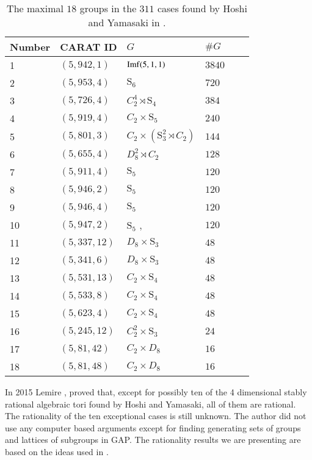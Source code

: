\documentclass[a4paper, 14pt]{extarticle}
\theoremstyle{plain}
\theoremstyle{definition}
\begin{document}
\begin{table}[H]\label{tbl:18Max}
\centering
\begin{tabular}{llllll} 
Number & CARAT ID & $G$ & $\#G$\\ \hline
 1  & $(5,942,1)$ & ${\rm Imf}(5,1,1)$ & $3840$\\
2  & $(5,953,4)$ & $\mathrm{S}_6$ & $720$ \\
3  & $(5,726,4)$ & $C_2^4\rtimes \mathrm{S}_4$ & $384$  \\
4  & $(5,919,4)$ & $C_2\times \mathrm{S}_5$ & $240$ \\
5 & $(5,801,3)$ & $C_2\times (\mathrm{S}_3^2\rtimes C_2)$ & $144$ \\
6 & $(5,655,4)$ & $D_8^2\rtimes C_2$ & $128$ \\
7  & $(5,911,4)$ & $\mathrm{S}_5$ & $120$ \\
8 & $(5,946,2)$ & $\mathrm{S}_5$ & $120$ \\
9 & $(5,946,4)$ & $\mathrm{S}_5$ & $120$ \\
10 & $(5,947,2)$ & $\mathrm{S}_5$ ,\,\,\,\,\,\,\,\,\,\,\,\,\,\,\,\,\,\,\,\,\,\,\,\,\,\,\,\,\,\ & $120$ \\
11 & $(5,337,12)$ & $D_8\times \mathrm{S}_3$ & $48$ \\
12  & $(5,341,6)$ & $D_8\times \mathrm{S}_3$ & $48$ \\
13  & $(5,531,13)$ & $C_2\times \mathrm{S}_4$ & $48$ \\
14  & $(5,533,8)$ & $C_2\times \mathrm{S}_4$ & $48$ \\
15 & $(5,623,4)$ & $C_2\times \mathrm{S}_4$ & $48$\\
16   & $(5,245,12)$ & $C_2^2\times \mathrm{S}_3$ & $24$\\
17  & $(5,81,42)$ & $C_2\times D_8$ & $16$ \\
18  & $(5,81,48)$ & $C_2\times D_8$ & $16$ \\
\end{tabular}
\caption{The maximal $18$ groups 
in the  $311$ cases found by Hoshi and Yamasaki in \cite{Hoshi}.}
\end{table}
\noindent
In 2015 Lemire \cite{Nicole1}, proved that, except for possibly ten of the 
4 dimensional stably rational algebraic tori found by Hoshi and Yamasaki, 
all of them are rational. The rationality of the ten exceptional cases is 
still unknown. The author did not use any computer based arguments except 
for finding generating sets of groups and lattices of subgroups in GAP. The 
rationality results we are presenting are based on the ideas used in \cite{Nicole1}. 
\end{document}
